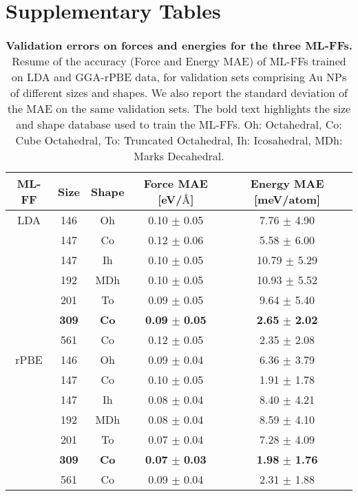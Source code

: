 \documentclass[%
aip,
 amsmath,amssymb,
 reprint,
]{revtex4-1}
\begin{document}
\section*{Supplementary Tables}
%
\begin{table}[h!]
    \centering
    \begin{tabular}{c|c|c|c|c}
    ML-FF & Size & Shape & Force MAE [eV/$\text{\AA}$] & Energy MAE [meV/atom]  \\
    \hline
LDA & 146 &  Oh & 0.10 $\pm$ 0.05 & 7.76  $\pm$ 4.90 \\
 & 147 &  Co &	0.12 $\pm$  0.06    & 5.58  $\pm$ 6.00 \\
 & 147 &  Ih &	0.10 $\pm$  0.05    & 10.79 $\pm$ 5.29 \\
 & 192 & MDh & 0.10 $\pm$  0.05     & 10.93 $\pm$ 5.52 \\
 & 201 &  To &	0.09 $\pm$  0.05    & 9.64  $\pm$ 5.40 \\
 & \textbf{309} &  \textbf{Co} &	\textbf{0.09} $\boldsymbol{\pm}$  \textbf{0.05}    & \textbf{2.65}  $\boldsymbol{\pm}$ \textbf{2.02} \\
 & 561 &  Co & 0.12 $\pm$  0.05     & 2.35  $\pm$ 2.08 \\
\hline
rPBE & 146 &  Oh &	0.09 $\pm$ 0.04 & 6.36 $\pm$ 3.79  \\
 & 147 &  Co &	0.10 $\pm$ 0.05     & 1.91 $\pm$ 1.78  \\
 & 147 &  Ih &	0.08 $\pm$ 0.04     & 8.40 $\pm$ 4.21  \\
 & 192 & MDh & 0.08  $\pm$ 0.04     & 8.59 $\pm$ 4.10  \\
 & 201 &  To &	0.07 $\pm$ 0.04     & 7.28 $\pm$ 4.09  \\
 & \textbf{309} &  \textbf{Co}  &	\textbf{0.07} $\boldsymbol{\pm}$ \textbf{0.03}  & \textbf{1.98} $\boldsymbol{\pm}$ \textbf{1.76}  \\
 & 561 &  Co &	0.09 $\pm$ 0.04     & 2.31 $\pm$ 1.88  \\
    \end{tabular}
    \caption{
    \textbf{Validation errors on forces and energies for the three ML-FFs.}
    Resume of the accuracy (Force and Energy MAE) of ML-FFs trained  on LDA and GGA-rPBE data, for validation sets comprising Au NPs of different sizes and shapes.
    We also report the standard deviation of the MAE on the same validation sets.
    The bold text highlights the size and shape database used to train the ML-FFs.
    Oh: Octahedral, Co: Cube Octahedral, To: Truncated Octahedral, Ih: Icosahedral, MDh: Marks Decahedral.}
    \label{tab:validation}
\end{table}
%
\newpage
\clearpage
\end{document}
